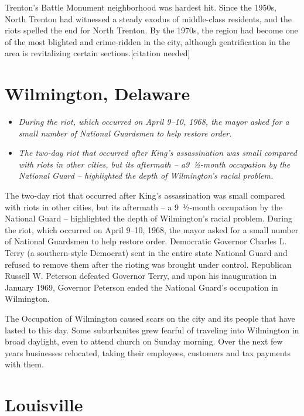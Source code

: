 Trenton's Battle Monument neighborhood was hardest hit. Since the 1950s,
North Trenton had witnessed a steady exodus of middle-class residents,
and the riots spelled the end for North Trenton. By the 1970s, the
region had become one of the most blighted and crime-ridden in the city,
although gentrification in the area is revitalizing certain
sections.{[}citation needed{]}

\section{Wilmington, Delaware}\label{wilmington-delaware}

\begin{itemize}
\item
  \emph{During the riot, which occurred on April 9--10, 1968, the mayor
  asked for a small number of National Guardsmen to help restore order.}
\item
  \emph{The two-day riot that occurred after King's assassination was
  small compared with riots in other cities, but its aftermath -- a
  ​9~1⁄2-month occupation by the National Guard -- highlighted the depth
  of Wilmington's racial problem.}
\end{itemize}

The two-day riot that occurred after King's assassination was small
compared with riots in other cities, but its aftermath -- a ​9~1⁄2-month
occupation by the National Guard -- highlighted the depth of
Wilmington's racial problem. During the riot, which occurred on April
9--10, 1968, the mayor asked for a small number of National Guardsmen to
help restore order. Democratic Governor Charles L. Terry (a
southern-style Democrat) sent in the entire state National Guard and
refused to remove them after the rioting was brought under control.
Republican Russell W. Peterson defeated Governor Terry, and upon his
inauguration in January 1969, Governor Peterson ended the National
Guard's occupation in Wilmington.

The Occupation of Wilmington caused scars on the city and its people
that have lasted to this day. Some suburbanites grew fearful of
traveling into Wilmington in broad daylight, even to attend church on
Sunday morning. Over the next few years businesses relocated, taking
their employees, customers and tax payments with them.

\section{Louisville}\label{louisville}

